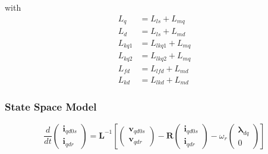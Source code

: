 %
with 
%
\begin{align}
  L_{q} &= L_{ls} + L_{mq} \\
  L_{d} &= L_{ls} + L_{md} \\
  L_{kq1} &= L_{lkq1} + L_{mq} \\
  L_{kq2} &= L_{lkq2} + L_{mq} \\
  L_{fd} &= L_{lfd} + L_{md} \\
  L_{kd} &= L_{lkd} + L_{md}
\end{align}
\subsubsection{State Space Model}
%
\begin{equation}
  \frac{d}{dt}
  \begin{pmatrix}
    \mathbf{i}_{qd0s} \\
    \mathbf{i}_{qdr}
  \end{pmatrix}
  = \mathbf{L}^{-1} \left[
  \begin{pmatrix}
    \mathbf{v}_{qd0s} \\
    \mathbf{v}_{qdr}
  \end{pmatrix}
  - \mathbf{R}
  \begin{pmatrix}
    \mathbf{i}_{qd0s} \\
    \mathbf{i}_{qdr}
  \end{pmatrix}
  - \omega_r
  \begin{pmatrix}
    \boldsymbol{\lambda}_{dq} \\
    0
  \end{pmatrix}
  \right]
\end{equation}
%
